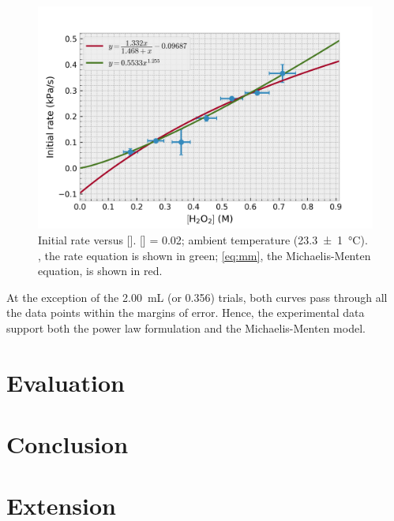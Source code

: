 \documentclass[a4paper, 12pt]{article}
\begin{document}
\begin{figure}[H]
    \centering
    \includegraphics[width=\textwidth]{data/processed_data}
    \caption{Initial rate versus []. [] = \SI{0.02}{\molar}; ambient temperature (\SI{23.3(10)}{\celsius}). , the rate equation is shown in green; \cref{eq:mm}, the Michaelis-Menten equation, is shown in red. }
    \label{fig:processed-data}
\end{figure}

At the exception of the \SI{2.00}{\mL} (or \SI{0.356}{\molar})  trials, both curves pass through all the data points within the margins of error. Hence, the experimental data support both the power law formulation and the Michaelis-Menten model. 

\section*{Evaluation}

\section*{Conclusion}

\section*{Extension}

\printbibliography
\end{document}
